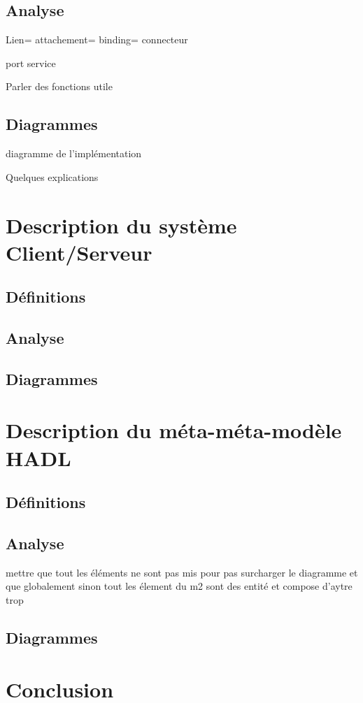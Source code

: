 \documentclass[11pt,a4paper]{article}
\begin{document}
\subsection{Analyse}

Lien= attachement= binding= connecteur

port service

Parler des fonctions utile




\subsection{Diagrammes}

diagramme de l'implémentation

Quelques explications



\section{Description du système Client/Serveur}
\subsection{Définitions}
\subsection{Analyse}
\subsection{Diagrammes}

\section{Description du méta-méta-modèle HADL}
\subsection{Définitions}
\subsection{Analyse}

mettre que tout les éléments ne sont pas mis pour pas surcharger le diagramme et que globalement sinon tout les élement du m2 sont des entité et compose d'aytre trop

\subsection{Diagrammes}

\section{Conclusion}
\end{document}

